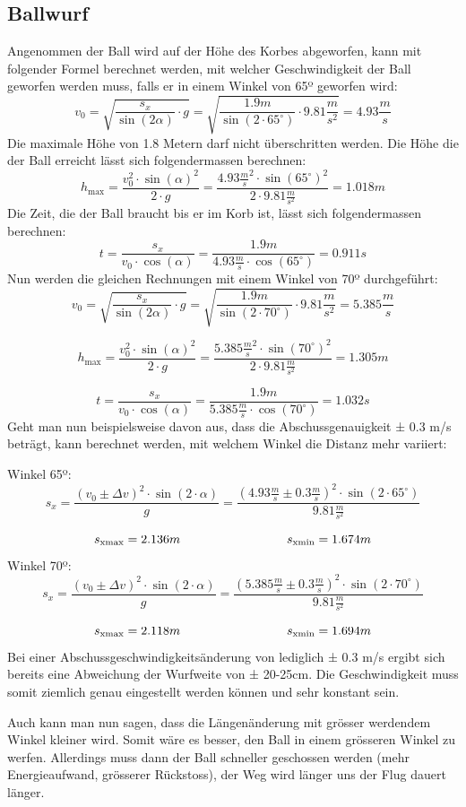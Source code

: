 \subsection{Ballwurf}
Angenommen der Ball wird auf der Höhe des Korbes abgeworfen, kann mit 
folgender Formel berechnet werden, mit welcher Geschwindigkeit der Ball 
geworfen werden muss, falls er in einem Winkel von 65º geworfen wird:
%
\[ v_0 
= \sqrt{ \frac{s_x}{\sin(2\alpha)} \cdot g } 
= \sqrt{ \frac{1.9m}{\sin(2 \cdot 65^\circ)} \cdot 9.81 \frac{m}{s^2}} 
= 4.93 \frac{m}{s} \]
%
Die maximale Höhe von 1.8 Metern darf nicht überschritten werden. Die Höhe die 
der Ball erreicht lässt sich folgendermassen berechnen:
%
\[ h_\text{max} 
= \frac{v_0^2 \cdot \sin(\alpha)^2}{2 \cdot g} 
= \frac{4.93 \frac{m}{s}^2 \cdot \sin(65^\circ)^2}{2 \cdot 9.81 \frac{m}{s^2}} 
= 1.018m \]
%
Die Zeit, die der Ball braucht bis er im Korb ist, lässt sich folgendermassen 
berechnen:
%
\[ t = \frac{s_x}{v_0 \cdot \cos(\alpha)} 
= \frac{1.9m}{4.93 \frac{m}{s} \cdot \cos(65^\circ)} = 0.911s \]
%
Nun werden die gleichen Rechnungen mit einem Winkel von 70º durchgeführt:
%
\[ v_0 = \sqrt{ \frac{s_x}{\sin(2\alpha)} \cdot g } 
= \sqrt{ \frac{1.9m}{\sin(2 \cdot 70^\circ)} \cdot 9.81 \frac{m}{s^2}} 
= 5.385 \frac{m}{s} \]

\[ h_\text{max} = \frac{v_0^2 \cdot \sin(\alpha)^2}{2 \cdot g} 
= \frac{5.385 \frac{m}{s}^2 \cdot \sin(70^\circ)^2}{2 \cdot 9.81 \frac{m}{s^2}} 
= 1.305m \]

\[ t = \frac{s_x}{v_0 \cdot \cos(\alpha)} 
= \frac{1.9m}{5.385 \frac{m}{s} \cdot \cos(70^\circ)} = 1.032s \]
%
Geht man nun beispielsweise davon aus, dass die Abschussgenauigkeit ± 0.3 m/s 
beträgt, kann berechnet werden, mit welchem Winkel die Distanz mehr variiert:

\noindent
Winkel 65º:
%
\[ s_x = \frac{(v_0 \pm \Delta v)^2 \cdot \sin(2 \cdot \alpha)}{g} 
= \frac{(4.93 \frac{m}{s} \pm 0.3 \frac{m}{s})^2 \cdot \sin(2 \cdot 65^\circ)}{9.81 \frac{m}{s^2}} \]

\[ s_\text{xmax} = 2.136m \hspace{30mm} s_\text{xmin} = 1.674m \]
%
Winkel 70º:
%
\[ s_x = \frac{(v_0 \pm \Delta v)^2 \cdot \sin(2 \cdot \alpha)}{g} 
= \frac{(5.385 \frac{m}{s} \pm 0.3 \frac{m}{s})^2 \cdot \sin(2 \cdot 70^\circ)}{9.81 \frac{m}{s^2}} \]

\[ s_\text{xmax} = 2.118m \hspace{30mm} s_\text{xmin} = 1.694m \]
%
Bei einer Abschussgeschwindigkeitsänderung von lediglich ± 0.3 m/s ergibt sich 
bereits eine Abweichung der Wurfweite von ± 20-25cm. Die Geschwindigkeit muss 
somit ziemlich genau eingestellt werden können und sehr konstant sein.

\noindent
Auch kann man nun sagen, dass die Längenänderung mit grösser werdendem Winkel 
kleiner wird. Somit wäre es besser, den Ball in einem grösseren Winkel zu 
werfen. Allerdings muss dann der Ball schneller geschossen werden (mehr 
Energieaufwand, grösserer Rückstoss), der Weg wird länger uns der Flug dauert 
länger.
